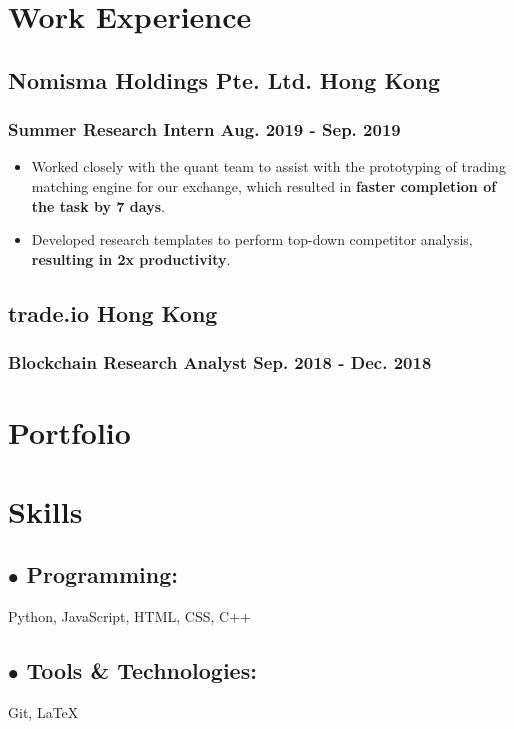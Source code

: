 \documentclass{article}
\begin{document}

\section{Work Experience}

\subsection{Nomisma Holdings Pte. Ltd. \hspace{4.1in} Hong Kong}
\subsubsection{Summer Research Intern \hspace{4.5in} Aug. 2019 - Sep. 2019}

\begin{itemize}[noitemsep]
\item Worked closely with the quant team to assist with the prototyping of trading matching engine for our exchange, which
resulted in \textbf{faster completion of the task by 7 days}.
\item Developed research templates to perform top-down competitor analysis, \textbf{resulting in 2x productivity}.
\end{itemize}



\subsection{trade.io \hspace{5.85in} Hong Kong}
\subsubsection{Blockchain Research Analyst \hspace{4.3in} Sep. 2018 - Dec. 2018}


\section{Portfolio}


\section{Skills}

\subsection{$\bullet$ Programming:  }

Python, JavaScript, HTML, CSS, C++

\subsection{$\bullet$ Tools \& Technologies:}

Git, {\LaTeX}
\end{document}
